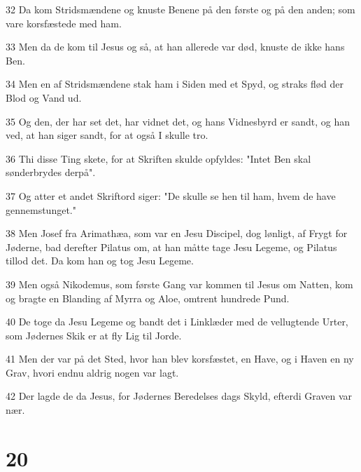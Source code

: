 \par 32 Da kom Stridsmændene og knuste Benene på den første og på den anden; som vare korsfæstede med ham.
\par 33 Men da de kom til Jesus og så, at han allerede var død, knuste de ikke hans Ben.
\par 34 Men en af Stridsmændene stak ham i Siden med et Spyd, og straks flød der Blod og Vand ud.
\par 35 Og den, der har set det, har vidnet det, og hans Vidnesbyrd er sandt, og han ved, at han siger sandt, for at også I skulle tro.
\par 36 Thi disse Ting skete, for at Skriften skulde opfyldes: "Intet Ben skal sønderbrydes derpå".
\par 37 Og atter et andet Skriftord siger: "De skulle se hen til ham, hvem de have gennemstunget."
\par 38 Men Josef fra Arimathæa, som var en Jesu Discipel, dog lønligt, af Frygt for Jøderne, bad derefter Pilatus om, at han måtte tage Jesu Legeme, og Pilatus tillod det. Da kom han og tog Jesu Legeme.
\par 39 Men også Nikodemus, som første Gang var kommen til Jesus om Natten, kom og bragte en Blanding af Myrra og Aloe, omtrent hundrede Pund.
\par 40 De toge da Jesu Legeme og bandt det i Linklæder med de vellugtende Urter, som Jødernes Skik er at fly Lig til Jorde.
\par 41 Men der var på det Sted, hvor han blev korsfæstet, en Have, og i Haven en ny Grav, hvori endnu aldrig nogen var lagt.
\par 42 Der lagde de da Jesus, for Jødernes Beredelses dags Skyld, efterdi Graven var nær.

\chapter{20}

